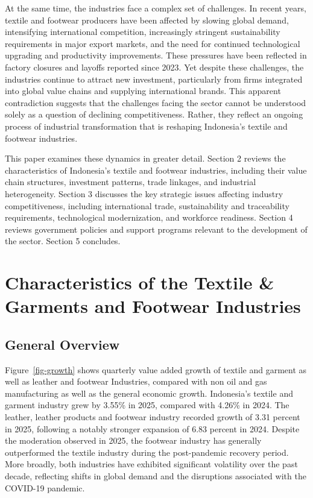 \documentclass[
  manuscript=article,
  layout=publish,
  year=2026,
  volume=1,
]{den}
\begin{document}
At the same time, the industries face a complex set of challenges. In
recent years, textile and footwear producers have been affected by
slowing global demand, intensifying international competition,
increasingly stringent sustainability requirements in major export
markets, and the need for continued technological upgrading and
productivity improvements. These pressures have been reflected in
factory closures and layoffs reported since 2023. Yet despite these
challenges, the industries continue to attract new investment,
particularly from firms integrated into global value chains and
supplying international brands. This apparent contradiction suggests
that the challenges facing the sector cannot be understood solely as a
question of declining competitiveness. Rather, they reflect an ongoing
process of industrial transformation that is reshaping Indonesia's
textile and footwear industries.

This paper examines these dynamics in greater detail. Section 2 reviews
the characteristics of Indonesia's textile and footwear industries,
including their value chain structures, investment patterns, trade
linkages, and industrial heterogeneity. Section 3 discusses the key
strategic issues affecting industry competitiveness, including
international trade, sustainability and traceability requirements,
technological modernization, and workforce readiness. Section 4 reviews
government policies and support programs relevant to the development of
the sector. Section 5 concludes.

\section{Characteristics of the Textile \& Garments and Footwear
Industries}\label{characteristics-of-the-textile-garments-and-footwear-industries}

\subsection{General Overview}\label{general-overview}

Figure~\ref{fig-growth} shows quarterly value added growth of textile
and garment as well as leather and footwear Industries, compared with
non oil and gas manufacturing as well as the general economic growth.
Indonesia's textile and garment industry grew by 3.55\% in 2025,
compared with 4.26\% in 2024. The leather, leather products and footwear
industry recorded growth of 3.31 percent in 2025, following a notably
stronger expansion of 6.83 percent in 2024. Despite the moderation
observed in 2025, the footwear industry has generally outperformed the
textile industry during the post-pandemic recovery period. More broadly,
both industries have exhibited significant volatility over the past
decade, reflecting shifts in global demand and the disruptions
associated with the COVID-19 pandemic.
\end{document}
